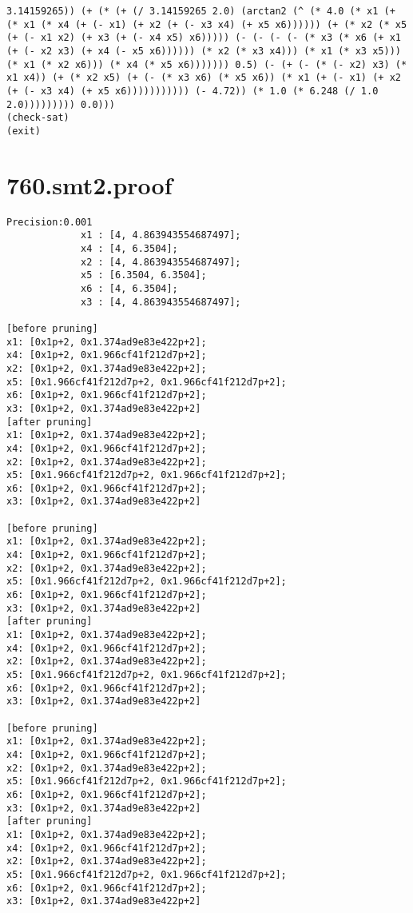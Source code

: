 \begin{lstlisting}
3.14159265)) (+ (* (+ (/ 3.14159265 2.0) (arctan2 (^ (* 4.0 (* x1 (+ (* x1 (* x4 (+ (- x1) (+ x2 (+ (- x3 x4) (+ x5 x6)))))) (+ (* x2 (* x5 (+ (- x1 x2) (+ x3 (+ (- x4 x5) x6))))) (- (- (- (- (* x3 (* x6 (+ x1 (+ (- x2 x3) (+ x4 (- x5 x6)))))) (* x2 (* x3 x4))) (* x1 (* x3 x5))) (* x1 (* x2 x6))) (* x4 (* x5 x6))))))) 0.5) (- (+ (- (* (- x2) x3) (* x1 x4)) (+ (* x2 x5) (+ (- (* x3 x6) (* x5 x6)) (* x1 (+ (- x1) (+ x2 (+ (- x3 x4) (+ x5 x6))))))))))) (- 4.72)) (* 1.0 (* 6.248 (/ 1.0 2.0))))))))) 0.0)))
(check-sat)
(exit)
\end{lstlisting}

\section{760.smt2.proof}
\begin{lstlisting}
Precision:0.001
             x1 : [4, 4.863943554687497];
             x4 : [4, 6.3504];
             x2 : [4, 4.863943554687497];
             x5 : [6.3504, 6.3504];
             x6 : [4, 6.3504];
             x3 : [4, 4.863943554687497];

[before pruning]
x1: [0x1p+2, 0x1.374ad9e83e422p+2];
x4: [0x1p+2, 0x1.966cf41f212d7p+2];
x2: [0x1p+2, 0x1.374ad9e83e422p+2];
x5: [0x1.966cf41f212d7p+2, 0x1.966cf41f212d7p+2];
x6: [0x1p+2, 0x1.966cf41f212d7p+2];
x3: [0x1p+2, 0x1.374ad9e83e422p+2]
[after pruning]
x1: [0x1p+2, 0x1.374ad9e83e422p+2];
x4: [0x1p+2, 0x1.966cf41f212d7p+2];
x2: [0x1p+2, 0x1.374ad9e83e422p+2];
x5: [0x1.966cf41f212d7p+2, 0x1.966cf41f212d7p+2];
x6: [0x1p+2, 0x1.966cf41f212d7p+2];
x3: [0x1p+2, 0x1.374ad9e83e422p+2]

[before pruning]
x1: [0x1p+2, 0x1.374ad9e83e422p+2];
x4: [0x1p+2, 0x1.966cf41f212d7p+2];
x2: [0x1p+2, 0x1.374ad9e83e422p+2];
x5: [0x1.966cf41f212d7p+2, 0x1.966cf41f212d7p+2];
x6: [0x1p+2, 0x1.966cf41f212d7p+2];
x3: [0x1p+2, 0x1.374ad9e83e422p+2]
[after pruning]
x1: [0x1p+2, 0x1.374ad9e83e422p+2];
x4: [0x1p+2, 0x1.966cf41f212d7p+2];
x2: [0x1p+2, 0x1.374ad9e83e422p+2];
x5: [0x1.966cf41f212d7p+2, 0x1.966cf41f212d7p+2];
x6: [0x1p+2, 0x1.966cf41f212d7p+2];
x3: [0x1p+2, 0x1.374ad9e83e422p+2]

[before pruning]
x1: [0x1p+2, 0x1.374ad9e83e422p+2];
x4: [0x1p+2, 0x1.966cf41f212d7p+2];
x2: [0x1p+2, 0x1.374ad9e83e422p+2];
x5: [0x1.966cf41f212d7p+2, 0x1.966cf41f212d7p+2];
x6: [0x1p+2, 0x1.966cf41f212d7p+2];
x3: [0x1p+2, 0x1.374ad9e83e422p+2]
[after pruning]
x1: [0x1p+2, 0x1.374ad9e83e422p+2];
x4: [0x1p+2, 0x1.966cf41f212d7p+2];
x2: [0x1p+2, 0x1.374ad9e83e422p+2];
x5: [0x1.966cf41f212d7p+2, 0x1.966cf41f212d7p+2];
x6: [0x1p+2, 0x1.966cf41f212d7p+2];
x3: [0x1p+2, 0x1.374ad9e83e422p+2]


\end{lstlisting}
